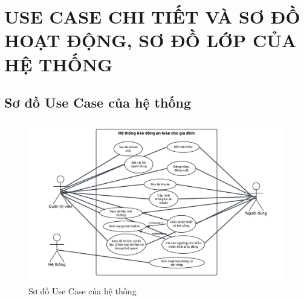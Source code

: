 \newpage
\section{USE CASE CHI TIẾT VÀ SƠ ĐỒ HOẠT ĐỘNG, SƠ ĐỒ LỚP CỦA HỆ THỐNG}
\subsection{Sơ đồ Use Case của hệ thống}

\begin{figure}[H]
    \centering
    \includegraphics[width=\textwidth]{figures/usecase_diagram.png}
    \caption{Sơ đồ Use Case của hệ thống}
    \label{fig:usecase_diagram}
\end{figure}

